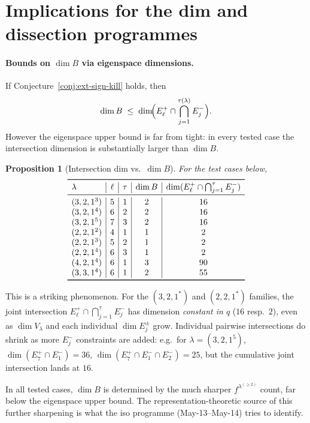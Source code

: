 \documentclass[11pt]{article}
\newtheorem{proposition}[theorem]{Proposition}
\theoremstyle{definition}
\newcommand{\Vlam}{V_\lambda}
\newcommand{\decl}{\lambda^{(\ge 2)}}
\begin{document}
\section{Implications for the dim and dissection programmes}\label{sec:implications}

\paragraph{Bounds on $\dim B$ via eigenspace dimensions.}  If
Conjecture~\ref{conj:ext-sign-kill} holds, then
\[
   \dim B \;\le\; \dim\!\Bigl( E_\ell^+ \cap \bigcap_{j=1}^{\tau(\lambda)} E_j^- \Bigr).
\]
However the eigenspace upper bound is far from tight: in every
tested case the intersection dimension is substantially larger
than $\dim B$.

\begin{proposition}[Intersection dim vs.\ $\dim B$]\label{prop:intersection-gap}
For the test cases below,
\[
\begin{array}{l|c|c|c|c}
\toprule
\lambda & \ell & \tau & \dim B & \dim(E_\ell^+ \cap \bigcap_{j=1}^\tau E_j^-) \\
\midrule
(3, 2, 1^3)        & 5 & 1 & 2 & 16 \\
(3, 2, 1^4)        & 6 & 2 & 2 & 16 \\
(3, 2, 1^5)        & 7 & 3 & 2 & 16 \\
(2, 2, 1^2)        & 4 & 1 & 1 &  2 \\
(2, 2, 1^3)        & 5 & 2 & 1 &  2 \\
(2, 2, 1^4)        & 6 & 3 & 1 &  2 \\
(4, 2, 1^4)        & 6 & 1 & 3 & 90 \\
(3, 3, 1^4)        & 6 & 1 & 2 & 55 \\
\bottomrule
\end{array}
\]
\end{proposition}

This is a striking phenomenon.  For the $(3, 2, 1^*)$ and
$(2, 2, 1^*)$ families, the joint intersection
$E_\ell^+ \cap \bigcap_{j=1}^\tau E_j^-$ has dimension
\emph{constant in $q$} ($16$ resp.\ $2$), even as $\dim \Vlam$ and
each individual $\dim E_j^\pm$ grow.  Individual pairwise
intersections do shrink as more $E_j^-$ constraints are added:
e.g.\ for $\lambda = (3, 2, 1^5)$, $\dim(E_7^+ \cap E_1^-) = 36$,
$\dim(E_7^+ \cap E_1^- \cap E_2^-) = 25$, but the cumulative joint
intersection lands at $16$.

In all tested cases, $\dim B$ is determined by the much sharper
$f^\decl$ count, far below the eigenspace upper bound.  The
representation-theoretic source of this further sharpening is what
the iso programme (May-13--May-14) tries to identify.
\end{document}
